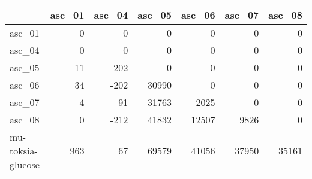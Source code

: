 \begin{tabular}{lrrrrrr}
\toprule
{} &  asc\_01 &  asc\_04 &  asc\_05 &  asc\_06 &  asc\_07 &  asc\_08 \\
\midrule
asc\_01            &       0 &       0 &       0 &       0 &       0 &       0 \\
asc\_04            &       0 &       0 &       0 &       0 &       0 &       0 \\
asc\_05            &      11 &    -202 &       0 &       0 &       0 &       0 \\
asc\_06            &      34 &    -202 &   30990 &       0 &       0 &       0 \\
asc\_07            &       4 &      91 &   31763 &    2025 &       0 &       0 \\
asc\_08            &       0 &    -212 &   41832 &   12507 &    9826 &       0 \\
mu-toksia-glucose &     963 &      67 &   69579 &   41056 &   37950 &   35161 \\
\bottomrule
\end{tabular}
